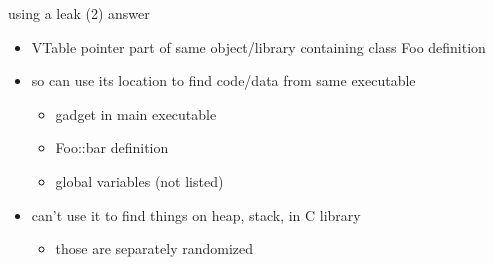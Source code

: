 \begin{frame}{using a leak (2) answer}
\begin{itemize}
\item VTable pointer part of same object/library containing class Foo definition
\item so can use its location to find code/data from same executable
    \begin{itemize}
    \item gadget in main executable
    \item Foo::bar definition
    \item global variables (not listed)
    \end{itemize}
\item can't use it to find things on heap, stack, in C library
    \begin{itemize}
    \item those are separately randomized
    \end{itemize}
\end{itemize}
\end{frame}
